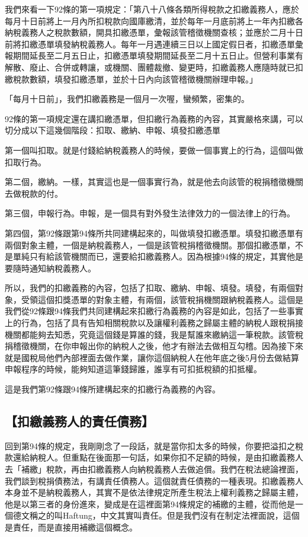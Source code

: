 \documentclass[oneside,sub3section]{ctexbook}
\begin{document}
我們來看一下92條的第一項規定：「第八十八條各類所得稅款之扣繳義務人，應於每月十日前將上一月內所扣稅款向國庫繳清，並於每年一月底前將上一年內扣繳各納稅義務人之稅款數額，開具扣繳憑單，彙報該管稽徵機關查核；並應於二月十日前將扣繳憑單填發納稅義務人。每年一月遇連續三日以上國定假日者，扣繳憑單彙報期間延長至二月五日止，扣繳憑單填發期間延長至二月十五日止。但營利事業有解散、廢止、合併或轉讓，或機關、團體裁撤、變更時，扣繳義務人應隨時就已扣繳稅款數額，填發扣繳憑單，並於十日內向該管稽徵機關辦理申報。」

「每月十日前」，我們扣繳義務是一個月一次喔，蠻頻繁，密集的。

92條的第一項規定還在講扣繳憑單，但扣繳行為義務的內容，其實嚴格來講，可以切分成以下這幾個階段：扣取、繳納、申報、填發扣繳憑單

第一個叫扣取。就是付錢給納稅義務人的時候，要做一個事實上的行為，這個叫做扣取行為。

第二個，繳納。一樣，其實這也是一個事實行為，就是他去向該管的稅捐稽徵機關去做稅款的付。

第三個，申報行為。申報，是一個具有對外發生法律效力的一個法律上的行為。

第四個，第92條跟第94條所共同建構起來的，叫做填發扣繳憑單。填發扣繳憑單有兩個對象主體，一個是納稅義務人，一個是該管稅捐稽徵機關。那個扣繳憑單，不是單純只有給該管機關而已，還要給扣繳義務人。因為根據94條的規定，其實他是要隨時通知納稅義務人。

所以，我們的扣繳義務的內容，包括了扣取、繳納、申報、填發。填發，有兩個對象，受領這個扣獎憑單的對象主體，有兩個，該管稅捐機關跟納稅義務人。這個是我們從92條跟94條我們共同建構起來扣繳行為義務的內容是如此，包括了一些事實上的行為，包括了具有告知相關稅款以及讓權利義務之歸屬主體的納稅人跟稅捐接機關都能夠去知悉，究竟這個錢是算誰的錢，我是幫誰來繳納這一筆稅款。該管稅捐稽徵機關，在你申報出你的納稅人之後，他才有辦法去做相互勾稽。因為接下來就是國稅局他們內部裡面去做作業，讓你這個納稅人在他年底之後5月份去做結算申報程序的時候，能夠知道這筆錢歸誰，誰享有可扣抵稅額的扣抵權。

這是我們第92條跟94條所建構起來的扣繳行為義務的內容。

\hypertarget{ux6263ux7e73ux7fa9ux52d9ux4ebaux7684ux8cacux4efbux50b5ux52d9}{%
\subsection{【扣繳義務人的責任債務】}\label{ux6263ux7e73ux7fa9ux52d9ux4ebaux7684ux8cacux4efbux50b5ux52d9}}

回到第94條的規定，我剛剛念了一段話，就是當你扣太多的時候，你要把溢扣之稅款還給納稅人。但重點在後面那一句話，如果你扣不足額的時候，是由扣繳義務人去「補繳」稅款，再由扣繳義務人向納稅義務人去做追償。我們在稅法總論裡面，我們談到稅捐債務法，有講責任債務人。這個就責任債務的一種表現。扣繳義務人本身並不是納稅義務人，其實不是依法律規定所產生稅法上權利義務之歸屬主體，他是以第三者的身份進來，變成是在這裡面第94條規定的補繳的主體，從而他是一個德文稱之的叫Haftung，中文其實叫責任。但是我們沒有在制定法裡面說，這個是責任，而是直接用補繳這個概念。
\end{document}
